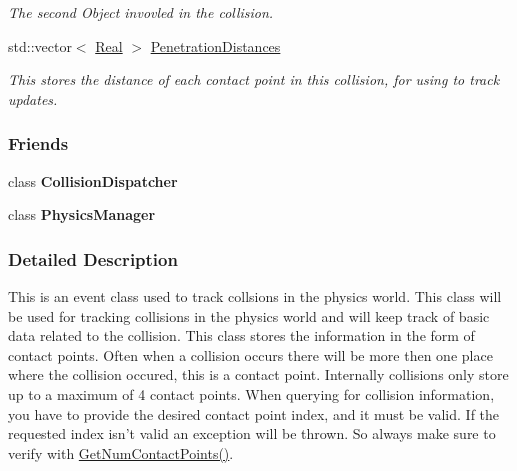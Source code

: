 \begin{DoxyCompactItemize}
\begin{DoxyCompactList}\small\item\em The second Object invovled in the collision. \item\end{DoxyCompactList}\item 
\hypertarget{classMezzanine_1_1Collision_a9245295110d3fe645879a5d798673939}{
std::vector$<$ \hyperlink{namespaceMezzanine_a726731b1a7df72bf3583e4a97282c6f6}{Real} $>$ \hyperlink{classMezzanine_1_1Collision_a9245295110d3fe645879a5d798673939}{PenetrationDistances}}
\label{classMezzanine_1_1Collision_a9245295110d3fe645879a5d798673939}

\begin{DoxyCompactList}\small\item\em This stores the distance of each contact point in this collision, for using to track updates. \item\end{DoxyCompactList}\end{DoxyCompactItemize}
\subsubsection*{Friends}
\begin{DoxyCompactItemize}
\item 
\hypertarget{classMezzanine_1_1Collision_aa4a13416efe17e957deb2cf4dcce3a60}{
class {\bfseries CollisionDispatcher}}
\label{classMezzanine_1_1Collision_aa4a13416efe17e957deb2cf4dcce3a60}

\item 
\hypertarget{classMezzanine_1_1Collision_a139cf05ac01161b7071c8a037c841683}{
class {\bfseries PhysicsManager}}
\label{classMezzanine_1_1Collision_a139cf05ac01161b7071c8a037c841683}

\end{DoxyCompactItemize}


\subsubsection{Detailed Description}
This is an event class used to track collsions in the physics world. This class will be used for tracking collisions in the physics world and will keep track of basic data related to the collision. This class stores the information in the form of contact points. Often when a collision occurs there will be more then one place where the collision occured, this is a contact point. Internally collisions only store up to a maximum of 4 contact points. When querying for collision information, you have to provide the desired contact point index, and it must be valid. If the requested index isn't valid an exception will be thrown. So always make sure to verify with \hyperlink{classMezzanine_1_1Collision_a75c8f35acf6ceba61b62da0049dcbf1c}{GetNumContactPoints()}. 

